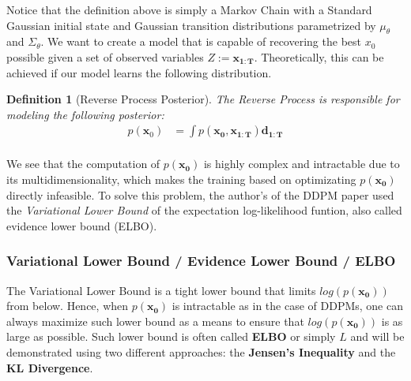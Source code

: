 \documentclass{article}
\newtheorem{definition}{Definition}[section]
\begin{document}
Notice that the definition above is simply a Markov Chain with a Standard Gaussian initial state and Gaussian transition distributions parametrized by $\mu_\theta$ and $\Sigma_\theta$. We want to create a model that is capable of recovering the best $x_0$ possible given a set of observed variables $Z := \mathbf{x_{1:T}}$. Theoretically, this can be achieved if our model learns the following distribution.

\begin{definition}[Reverse Process Posterior]
	The Reverse Process is responsible for modeling the following posterior:
	\label{def:rev_process_post}
	\begin{align}
		p(\mathbf{x}_0) &=  \int p(\mathbf{x_0}, \mathbf{x_{1:T}})\mathbf{d_{1:T}} \\
	\end{align}
\end{definition}

We see that the computation of $p(\mathbf{x_0})$ is highly complex and intractable due to its multidimensionality, which makes the training based on optimizating $p(\mathbf{x_{0}})$ directly infeasible. To solve this problem, the author's of the DDPM paper used the \textit{Variational Lower Bound} of the expectation log-likelihood funtion, also called evidence lower bound (ELBO).

\subsubsection{Variational Lower Bound / Evidence Lower Bound / ELBO}

 The Variational Lower Bound is a tight lower bound that limits $log(p(\mathbf{x_0}))$ from below. Hence, when $p(\mathbf{x_0})$ is intractable as in the case of DDPMs, one can always maximize such lower bound as a means to ensure that $log(p(\mathbf{x_0}))$ is as large as possible. Such lower bound is often called \textbf{ELBO} or simply \textbf{$L$} and will be demonstrated using two different approaches: the \textbf{Jensen's Inequality} and the \textbf{KL Divergence}.
\end{document}
